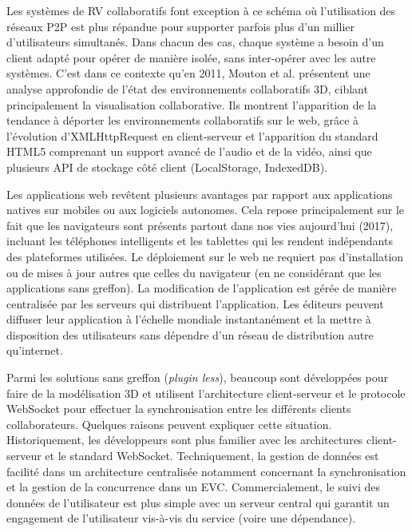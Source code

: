 Les systèmes de \gls{RV} collaboratifs font exception à ce schéma où l'utilisation 
des réseaux \gls{P2P} est plus répandue pour supporter parfois plus d'un millier 
d'utilisateurs simultanés. 
Dans chacun des cas, chaque système a besoin d'un client adapté pour opérer de 
manière isolée, sans inter-opérer avec les autre systèmes. 
C'est dans ce contexte qu'en 2011, Mouton et al. \cite{Mouton2011} présentent 
une analyse approfondie de l'état des environnements collaboratifs 3D, ciblant 
principalement la visualisation collaborative. 
Ils montrent l'apparition de la tendance à déporter les environnements collaboratifs 
sur le web, grâce à l'évolution d'XMLHttpRequest en client-serveur et l'apparition 
du standard HTML5 comprenant un support avancé de l'audio et de la vidéo, ainsi 
que plusieurs \gls{API} de stockage côté client (LocalStorage, IndexedDB). 

Les applications web revêtent plusieurs avantages par rapport aux applications 
natives sur mobiles ou aux logiciels autonomes. 
Cela repose principalement sur le fait que les navigateurs sont présents partout 
dans nos vies aujourd'hui (2017), incluant les téléphones intelligents et les 
tablettes qui les rendent indépendants des plateformes utilisées. 
Le déploiement sur le web ne requiert pas d'installation ou de mises à jour autres 
que celles du navigateur (en ne considérant que les applications sans greffon). 
La modification de l'application est gérée de manière centralisée par les serveurs 
qui distribuent l'application. 
Les éditeurs peuvent diffuser leur application à l'échelle mondiale instantanément  
et la mettre à disposition des utilisateurs sans dépendre d'un réseau de distribution 
autre qu'internet.


Parmi les solutions sans greffon (\textit{plugin less}), beaucoup sont développées 
pour faire de la modélisation 3D et utilisent l'architecture client-serveur et le 
protocole \gls{WebSocket} pour effectuer la synchronisation entre les différents 
clients collaborateurs. Quelques raisons peuvent expliquer cette situation. 
Historiquement, les développeurs sont plus familier avec les architectures 
client-serveur et le standard \gls{WebSocket}. Techniquement, la gestion de 
données est facilité dans un architecture centralisée notamment concernant la 
synchronisation et la gestion de la concurrence dans un \gls{EVC}. 
Commercialement, le suivi des données de l'utilisateur est plus simple avec un 
serveur central qui garantit un engagement de l'utilisateur vis-à-vis du service 
(voire une dépendance).


